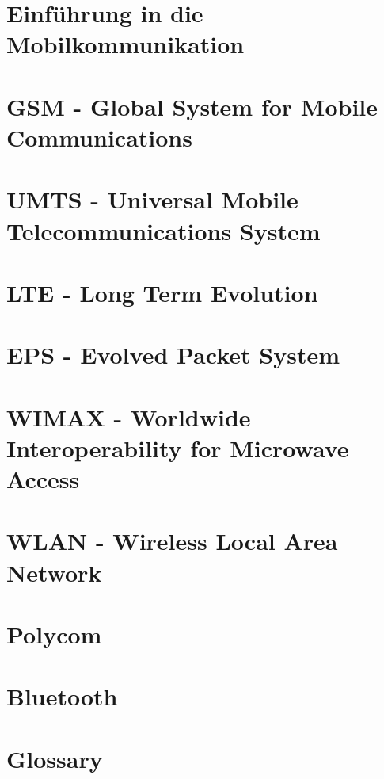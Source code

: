 \documentclass[10pt,twoside,a4paper,fleqn]{article}
\begin{document}
\begin{titlepage}
	\maketitle

	\vspace{100mm}

	\thispagestyle{empty} %
\end{titlepage}
\setcounter{tocdepth}{2}
\tableofcontents 

\newpage

\section{Einführung in die Mobilkommunikation}

\section{GSM - Global System for Mobile Communications}

\section{UMTS - Universal Mobile Telecommunications System}

\section{LTE - Long Term Evolution}


\section{EPS - Evolved Packet System}

\section{WIMAX - Worldwide Interoperability for Microwave Access}

\section{WLAN - Wireless Local Area Network}

\section{Polycom}

\section{Bluetooth}

\newpage
\appendix
\section{Glossary}

\end{document}
